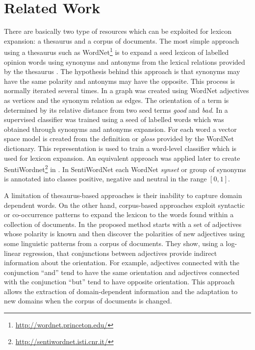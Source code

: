 \documentclass{sig-alternate}
\begin{document}
\section{Related Work}\label{sec:related}
There are basically two type of resources which can be exploited for lexicon expansion: a  thesaurus and a corpus of documents. The most simple approach using a thesaurus such as WordNet\footnote{\url{http://wordnet.princeton.edu/}} is to expand a seed lexicon of labelled opinion words using synonyms and antonyms from the lexical relations provided by the thesaurus 
\cite{Liu2004,Kim2004}. The hypothesis behind this approach is that synonyms may have the same polarity and antonyms may have the opposite. This process is normally iterated several times.
In \cite{kamps2004} a graph was created using WordNet adjectives as vertices and the synonym relation as edges. The orientation of a term is determined by its relative distance from two seed terms \emph{good} and \emph{bad}. In \cite{Esuli2005} a supervised classifier was trained using a seed of labelled words which was obtained through synonyms and antonyms expansion. For each word a vector space model is created from the definition or \emph{gloss} provided by the WordNet dictionary. This representation is used to train a word-level classifier which is used for lexicon expansion. An equivalent approach was applied later to create SentiWordnet\footnote{\url{http://sentiwordnet.isti.cnr.it/}} in \cite{esuli2006, Baccianella2010}. In SentiWordNet each WordNet \emph{synset} or group of synonyms is  annotated into classes positive, negative and neutral in the range $[0,1]$.    

A limitation of thesaurus-based approaches is their inability to capture domain dependent words. On the other hand, corpus-based approaches exploit syntactic or co-occurrence patterns to expand the lexicon to the words found within a collection of documents. 
In \cite{Hatziva1997} the proposed method starts with a set of adjectives whose polarity is known and then discover the polarities of new adjectives using some linguistic patterns from a corpus of documents. They show, using a log-linear regression, that conjunctions between adjectives provide indirect information about the orientation. For example, adjectives connected with the conjunction ``and'' tend to have the same orientation and adjectives connected with the conjunction ``but'' tend to have opposite orientation. This approach allows the extraction of domain-dependent information and the adaptation to new domains when the corpus of documents is changed. 
\end{document}
